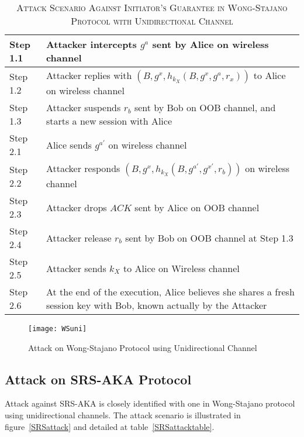 \begin{table}[t]
\centering
\caption{\textsc{Attack Scenario Against Initiator's Guarantee in Wong-Stajano Protocol with Unidirectional Channel}}
\label{WSuniattack}
{\small
\begin{tabular}{| l | p{11cm} |}
 \hline
 Step 1.1 & Attacker intercepts $g^{a}$ sent by Alice on wireless channel\\ \hline
 Step 1.2 & Attacker replies with $(B, g^{x}, h_{k_X}(B,g^{x},g^a,r_x))$ to Alice on wireless channel\\ \hline
 Step 1.3 & Attacker suspends $r_b$ sent by Bob on OOB channel, and starts a new session with Alice\\ \hline \hline
 Step 2.1 & Alice sends $g^{a'}$ on wireless channel\\ \hline
 Step 2.2 & Attacker responds $(B, g^{x}, h_{k_X}(B,g^{a'},g^{x'},r_b))$ on wireless channel\\ \hline
 Step 2.3 & Attacker drops $ACK$ sent by Alice on OOB channel\\ \hline
 Step 2.4 & Attacker release $r_b$ sent by Bob on OOB channel at Step 1.3\\ \hline
 Step 2.5 & Attacker sends $k_X$ to Alice on Wireless channel\\ \hline
 Step 2.6 & At the end of the execution, Alice believes she shares a fresh session key with Bob, known actually by the Attacker\\ \hline
\end{tabular}
}
\end{table}

\begin{figure}
  \centering
  \texttt{[image: WSuni]}
  \caption{Attack on Wong-Stajano Protocol using Unidirectional Channel}
  \label{WSuniattack}
\end{figure}

\subsection{Attack on SRS-AKA Protocol}

Attack against SRS-AKA is closely identified with one in Wong-Stajano protocol using unidirectional channels. The attack scenario is illustrated in figure~\ref{SRSattack} and detailed at table~\ref{SRSattacktable}.

